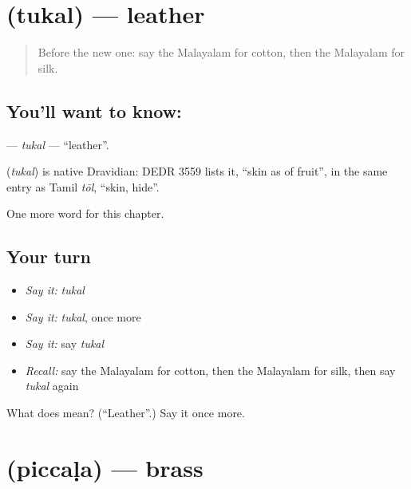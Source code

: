 \section[\texorpdfstring{\ml{തുകൽ} (tukal)}{തുകൽ (tukal)}]{ (tukal) — leather}

\label{lesson:ML-C217-tukal}



\begin{quote}
Before the new one: say the Malayalam for cotton, then the Malayalam for silk.
\end{quote}

\subsection*{You'll want to know: }
\textbf{} — \emph{tukal} — \textquotedblleft{}leather\textquotedblright{}.

\begin{cousinweb}
\textbf{} (\emph{tukal}) is native Dravidian: DEDR 3559 lists it, \textquotedblleft{}skin as of fruit\textquotedblright{}, in the same entry as Tamil \emph{tōl}, \textquotedblleft{}skin, hide\textquotedblright{}.
\end{cousinweb}

\begin{grammarlens}[title={What you've built}]
One more word for this chapter.
\end{grammarlens}

\subsection*{Your turn}
\begin{itemize}
\raggedright
  \item \emph{Say it:} \emph{tukal}
  \item \emph{Say it:} \emph{tukal}, once more
  \item \emph{Say it:} say \emph{tukal}
  \item \emph{Recall:} say the Malayalam for cotton, then the Malayalam for silk, then say \emph{tukal} again
\end{itemize}

\begin{tcolorbox}[breakable,colback=teal!4,colframe=teal!35!black,title={Before you move on}]
What does  mean? (\textquotedblleft{}Leather\textquotedblright{}.) Say it once more.
\end{tcolorbox}
\section[\texorpdfstring{\ml{പിച്ചള} (piccaḷa)}{പിച്ചള (piccaḷa)}]{ (piccaḷa) — brass}


